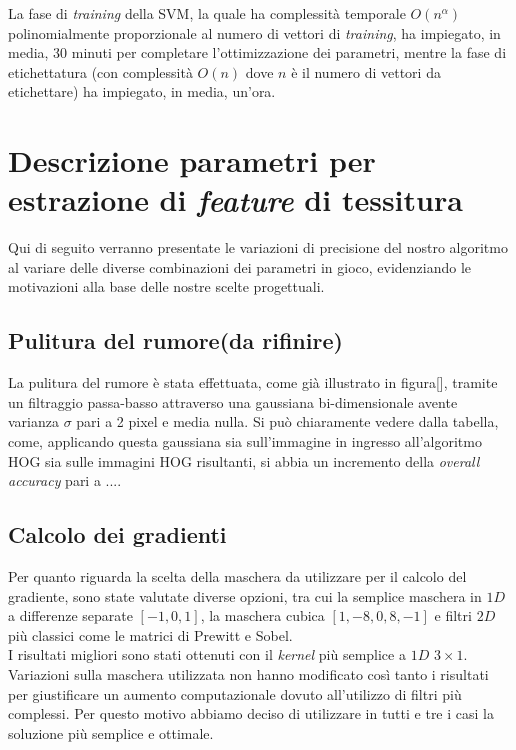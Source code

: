La fase di \emph{training} della SVM, la quale ha complessità temporale $O(n^\alpha)$ polinomialmente proporzionale al numero di vettori di \emph{training}, ha impiegato, in media, 30 minuti per completare l'ottimizzazione dei parametri, mentre la fase di etichettatura (con complessità $O(n)$ dove $n$ è il numero di vettori da etichettare) ha impiegato, in media, un'ora.

%

\section{Descrizione parametri per estrazione di \emph{feature} di tessitura}
Qui di seguito verranno presentate le variazioni di precisione del nostro algoritmo al variare delle diverse combinazioni dei parametri in gioco, evidenziando le motivazioni alla base delle nostre scelte progettuali.

\subsection{Pulitura del rumore(da rifinire)}
La pulitura del rumore è stata effettuata, come già illustrato in figura[], tramite un filtraggio passa-basso attraverso una gaussiana bi-dimensionale avente varianza $\sigma$ pari a 2 pixel e media nulla. Si può chiaramente vedere dalla tabella, come, applicando questa gaussiana sia sull'immagine in ingresso all'algoritmo HOG sia sulle immagini HOG risultanti, si abbia un incremento della \emph{overall accuracy} pari a ....

\subsection{Calcolo dei gradienti}
Per quanto riguarda la scelta della maschera da utilizzare per il calcolo del gradiente, sono state valutate diverse opzioni, tra cui la semplice maschera in $1D$ a differenze separate $[-1, 0 ,1]$, la maschera cubica $[1,-8,0,8,-1]$ e filtri  $2D$ più classici come le matrici di Prewitt e Sobel.\\
I risultati migliori sono stati ottenuti con il \emph{kernel} più semplice a $1D$ $3\times1$. Variazioni sulla maschera utilizzata non hanno modificato così tanto i risultati per giustificare un aumento computazionale dovuto all'utilizzo di filtri più complessi. Per questo motivo abbiamo deciso di utilizzare in tutti e tre i casi la soluzione più semplice e ottimale.\\

